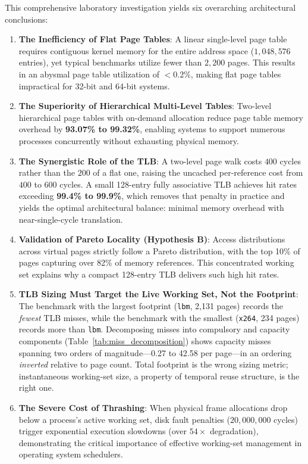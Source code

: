 \documentclass[11pt,a4paper]{article}
\begin{document}
This comprehensive laboratory investigation yields six overarching architectural conclusions:
\begin{enumerate}
    \item \textbf{The Inefficiency of Flat Page Tables}: A linear single-level page table requires contiguous kernel memory for the entire address space ($1,048,576$ entries), yet typical benchmarks utilize fewer than $2,200$ pages. This results in an abysmal page table utilization of $< 0.2\%$, making flat page tables impractical for 32-bit and 64-bit systems.
    \item \textbf{The Superiority of Hierarchical Multi-Level Tables}: Two-level hierarchical page tables with on-demand allocation reduce page table memory overhead by \textbf{93.07\% to 99.32\%}, enabling systems to support numerous processes concurrently without exhausting physical memory.
    \item \textbf{The Synergistic Role of the TLB}: A two-level page walk costs $400$ cycles rather than the $200$ of a flat one, raising the uncached per-reference cost from $400$ to $600$ cycles. A small 128-entry fully associative TLB achieves hit rates exceeding \textbf{99.4\% to 99.9\%}, which removes that penalty in practice and yields the optimal architectural balance: minimal memory overhead with near-single-cycle translation.
    \item \textbf{Validation of Pareto Locality (Hypothesis B)}: Access distributions across virtual pages strictly follow a Pareto distribution, with the top 10\% of pages capturing over 82\% of memory references. This concentrated working set explains why a compact 128-entry TLB delivers such high hit rates.
    \item \textbf{TLB Sizing Must Target the Live Working Set, Not the Footprint}: The benchmark with the largest footprint (\texttt{lbm}, 2,131 pages) records the \emph{fewest} TLB misses, while the benchmark with the smallest (\texttt{x264}, 234 pages) records more than \texttt{lbm}. Decomposing misses into compulsory and capacity components (Table~\ref{tab:miss_decomposition}) shows capacity misses spanning two orders of magnitude---0.27 to 42.58 per page---in an ordering \emph{inverted} relative to page count. Total footprint is the wrong sizing metric; instantaneous working-set size, a property of temporal reuse structure, is the right one.
    \item \textbf{The Severe Cost of Thrashing}: When physical frame allocations drop below a process's active working set, disk fault penalties ($20{,}000{,}000$ cycles) trigger exponential execution slowdowns (over $54\times$ degradation), demonstrating the critical importance of effective working-set management in operating system schedulers.
\end{enumerate}
\end{document}
